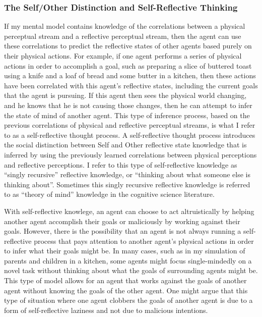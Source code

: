 \subsubsection{The Self/Other Distinction and Self-Reflective Thinking}

If my mental model contains knowledge of the correlations between a
physical perceptual stream and a reflective perceptual stream, then
the agent can use these correlations to predict the reflective states
of other agents based purely on their physical actions. For example,
if one agent performs a series of physical actions in order to
accomplish a goal, such as preparing a slice of buttered toast using a
knife and a loaf of bread and some butter in a kitchen, then these
actions have been correlated with this agent's reflective states,
including the current goals that the agent is pursuing. If this agent
then sees the physical world changing, and he knows that he is not
causing those changes, then he can attempt to infer the state of mind
of another agent. This type of inference process, based on the
previous correlations of physical and reflective perceptual streams,
is what I refer to as a self-reflective thought process. A
self-reflective thought process introduces the social distinction
between Self and Other reflective state knowledge that is inferred by
using the previously learned correlations between physical perceptions
and reflective perceptions. I refer to this type of self-reflective
knowledge as ``singly recursive'' reflective knowledge, or ``thinking
about what someone else is thinking about''. Sometimes this singly
recursive reflective knowledge is referred to as ``theory of mind''
knowledge in the cognitive science literature.

With self-reflective knowlege, an agent can choose to act
altruistically by helping another agent accomplish their goals or
maliciously by working against their goals. However, there is the
possibility that an agent is not always running a self-reflective
process that pays attention to another agent's physical actions in
order to infer what their goals might be. In many cases, such as in
my simulation of parents and children in a kitchen, some agents might
focus single-mindedly on a novel task without thinking about what the
goals of surrounding agents might be. This type of model allows for an
agent that works against the goals of another agent without knowing
the goals of the other agent. One might argue that this type of
situation where one agent clobbers the goals of another agent is due
to a form of self-reflective laziness and not due to malicious
intentions.

